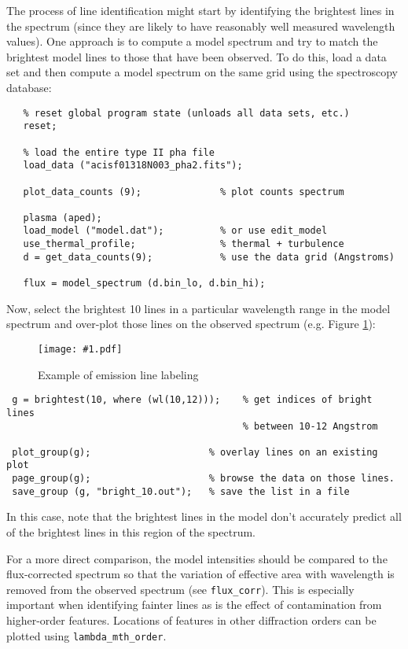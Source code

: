 \documentclass{book}
\newcommand{\putfig}[1]{\texttt{[image: \#1.pdf]}}
\newcommand{\putfig}[1]{\psfig{file=#1.ps}}
\begin{document}
{The process of line identification might start by identifying the brightest
lines in the spectrum (since they are likely to have reasonably well
measured wavelength values).  One approach is to compute a model
spectrum and try to match the brightest model lines to those that have
been observed.  To do this, load a data set and then compute a model
spectrum on the same grid using the spectroscopy database:

 \begin{verbatim}
   % reset global program state (unloads all data sets, etc.)
   reset;

   % load the entire type II pha file
   load_data ("acisf01318N003_pha2.fits");

   plot_data_counts (9);              % plot counts spectrum

   plasma (aped);
   load_model ("model.dat");          % or use edit_model
   use_thermal_profile;               % thermal + turbulence
   d = get_data_counts(9);            % use the data grid (Angstroms)

   flux = model_spectrum (d.bin_lo, d.bin_hi);
 \end{verbatim}

Now, select the brightest 10
lines in a particular wavelength range in the model spectrum and
over-plot those lines on the observed spectrum (e.g. Figure
\ref{fig:line_id}):

\begin{figure}[ht]
\putfig{figures/line_id}
\caption{Example of emission line labeling}
\label{fig:line_id}
\end{figure}

\begin{verbatim}
 g = brightest(10, where (wl(10,12)));    % get indices of bright lines
                                          % between 10-12 Angstrom

 plot_group(g);                     % overlay lines on an existing plot
 page_group(g);                     % browse the data on those lines.
 save_group (g, "bright_10.out");   % save the list in a file
\end{verbatim}
In this case, note that the brightest lines in the model don't accurately
predict all of the brightest lines in this region of the spectrum.

For a more direct comparison, the model intensities should be compared to
the flux-corrected spectrum so that the variation of effective area with
wavelength is removed from the observed spectrum (see {\tt flux\_corr}).
This is especially important when identifying fainter lines as is the effect
of contamination from higher-order features. Locations of features in other
diffraction orders can be plotted using {\tt lambda\_mth\_order}.

}
\end{document}
